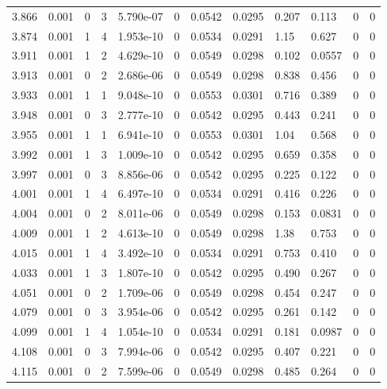 \documentclass[preview]{standalone}
\begin{document}
{{{{{{{\begin{tabular}{L{1.2cm}C{1.2cm} C{0.3cm}C{0.5cm} C{1.4cm}C{1.4cm} C{1.4cm}C{1.4cm} C{1.6cm}C{1.6cm} C{1.6cm}C{1.6cm}}
  3.866  &  0.001  & 0     &  3 &  5.790e-07  & 0  &  0.0542&   0.0295& 0.207 & 0.113   &  0 & 0  \\ 
  3.874  &  0.001  & 1     &  4 &  1.953e-10  & 0  &  0.0534&   0.0291& 1.15 & 0.627   &  0 & 0  \\ 
  3.911  &  0.001  & 1     &  2 &  4.629e-10  & 0  &  0.0549&   0.0298& 0.102 & 0.0557   &  0 & 0  \\ 
  3.913  &  0.001  & 0     &  2 &  2.686e-06  & 0  &  0.0549&   0.0298& 0.838 & 0.456   &  0 & 0  \\ 
  3.933  &  0.001  & 1     &  1 &  9.048e-10  & 0  &  0.0553&   0.0301& 0.716 & 0.389   &  0 & 0  \\ 
  3.948  &  0.001  & 0     &  3 &  2.777e-10  & 0  &  0.0542&   0.0295& 0.443 & 0.241   &  0 & 0  \\ 
  3.955  &  0.001  & 1     &  1 &  6.941e-10  & 0  &  0.0553&   0.0301& 1.04 & 0.568   &  0 & 0  \\ 
  3.992  &  0.001  & 1     &  3 &  1.009e-10  & 0  &  0.0542&   0.0295& 0.659 & 0.358   &  0 & 0  \\ 
  3.997  &  0.001  & 0     &  3 &  8.856e-06  & 0  &  0.0542&   0.0295& 0.225 & 0.122   &  0 & 0  \\ 
  4.001  &  0.001  & 1     &  4 &  6.497e-10  & 0  &  0.0534&   0.0291& 0.416 & 0.226   &  0 & 0  \\ 
  4.004  &  0.001  & 0     &  2 &  8.011e-06  & 0  &  0.0549&   0.0298& 0.153 & 0.0831   &  0 & 0  \\ 
  4.009  &  0.001  & 1     &  2 &  4.613e-10  & 0  &  0.0549&   0.0298& 1.38 & 0.753   &  0 & 0  \\ 
  4.015  &  0.001  & 1     &  4 &  3.492e-10  & 0  &  0.0534&   0.0291& 0.753 & 0.410   &  0 & 0  \\ 
  4.033  &  0.001  & 1     &  3 &  1.807e-10  & 0  &  0.0542&   0.0295& 0.490 & 0.267   &  0 & 0  \\ 
  4.051  &  0.001  & 0     &  2 &  1.709e-06  & 0  &  0.0549&   0.0298& 0.454 & 0.247   &  0 & 0  \\ 
  4.079  &  0.001  & 0     &  3 &  3.954e-06  & 0  &  0.0542&   0.0295& 0.261 & 0.142   &  0 & 0  \\ 
  4.099  &  0.001  & 1     &  4 &  1.054e-10  & 0  &  0.0534&   0.0291& 0.181 & 0.0987   &  0 & 0  \\ 
  4.108  &  0.001  & 0     &  3 &  7.994e-06  & 0  &  0.0542&   0.0295& 0.407 & 0.221   &  0 & 0  \\ 
  4.115  &  0.001  & 0     &  2 &  7.599e-06  & 0  &  0.0549&   0.0298& 0.485 & 0.264   &  0 & 0  \\ 

\end{tabular}}}}}}}}
\end{document}
